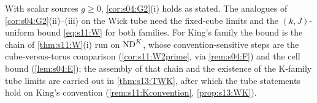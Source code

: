 \begin{remark}\label{rem:s04:wick}
With scalar sources $g\ge0$, \cref{cor:s04:G2}(i) holds as stated. The analogues of \cref{cor:s04:G2}(ii)--(iii) on the Wick tube need the fixed-cube limits and the $(k,J)$-uniform bound \eqref{eq:s11:W} for both families. For King's family the bound is the chain of \cref{thm:s11:W}(i) run on $\mathrm{ND}^{K}$, whose convention-sensitive steps are the cube-versus-torus comparison (\cref{cor:s11:W2prime}, via \cref{rem:s04:F}) and the cell bound (\cref{lem:s04:E}); the assembly of that chain and the existence of the K-family tube limits are carried out in \cref{thm:s13:TWK}, after which the tube statements hold on King's convention (\cref{rem:s11:Kconvention}, \cref{prop:s13:WK}).
\end{remark}

